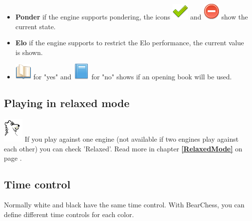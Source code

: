 \documentclass[11pt,a4paper]{article}
\begin{document}
\begin{itemize}
	\item \textbf{Ponder} if the engine supports pondering, the icons \includegraphics[scale=0.4]{tick.png} and \includegraphics[scale=0.4]{delete.png} show the current state.
	\item \textbf{Elo} if the engine supports to restrict the Elo performance, the current value is shown.
	\item  \includegraphics[scale=0.4]{book_open.png} for "yes" and \includegraphics[scale=0.4]{book.png} for "no" shows if an opening book will be used.
\end{itemize}

\subsection{Playing in relaxed mode}

\includegraphics[scale=0.8]{BearChessIcon.png} If you play against one engine (not available if two engines play against each other) you can check 'Relaxed'.  Read more in chapter \textbf{\ref{RelaxedMode}  } on page \pageref{RelaxedMode}.


\subsection{Time control}

Normally white and black have the same time control. With BearChess, you can define different time controls for each color.
\end{document}
